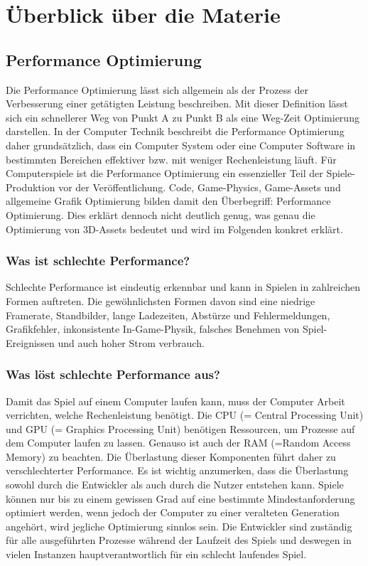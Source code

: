 \chapter{Überblick über die Materie}

\section{Performance Optimierung}

Die Performance Optimierung lässt sich allgemein als der Prozess der Verbesserung einer getätigten Leistung beschreiben. Mit dieser Definition lässt sich ein schnellerer Weg von Punkt A zu Punkt B als eine Weg-Zeit Optimierung darstellen. In der Computer Technik beschreibt die Performance Optimierung daher grundsätzlich, dass ein Computer System oder eine Computer Software in bestimmten Bereichen effektiver bzw. mit weniger Rechenleistung läuft. Für Computerspiele ist die Performance Optimierung ein essenzieller Teil der Spiele-Produktion vor der Veröffentlichung. Code, Game-Physics, Game-Assets und allgemeine Grafik Optimierung bilden damit den Überbegriff: Performance Optimierung. Dies erklärt dennoch nicht deutlich genug, was genau die Optimierung von 3D-Assets bedeutet und wird im Folgenden konkret erklärt.\cite[648]{_advances}

\subsection{Was ist schlechte Performance?}

Schlechte Performance ist eindeutig erkennbar und kann in Spielen in zahlreichen Formen auftreten. Die gewöhnlichsten Formen davon sind eine niedrige Framerate, Standbilder, lange Ladezeiten, Abstürze und Fehlermeldungen, Grafikfehler, inkonsistente In-Game-Physik, falsches Benehmen von Spiel-Ereignissen und auch hoher Strom verbrauch.

\subsection{Was löst schlechte Performance aus?}

Damit das Spiel auf einem Computer laufen kann, muss der Computer Arbeit verrichten, welche Rechenleistung benötigt. Die CPU (= Central Processing Unit) und GPU (= Graphics Processing Unit) benötigen Ressourcen, um Prozesse auf dem Computer laufen zu lassen. Genauso ist auch der RAM (=Random Access Memory) zu beachten. Die Überlastung dieser Komponenten führt daher zu verschlechterter Performance. Es ist wichtig anzumerken, dass die Überlastung sowohl durch die Entwickler als auch durch die Nutzer entstehen kann.\cite[17]{_unity_game_optimization} Spiele können nur bis zu einem gewissen Grad auf eine bestimmte Mindestanforderung optimiert werden, wenn jedoch der Computer zu einer veralteten Generation angehört, wird jegliche Optimierung sinnlos sein. Die Entwickler sind zuständig für alle ausgeführten Prozesse während der Laufzeit des Spiels und deswegen in vielen Instanzen hauptverantwortlich für ein schlecht laufendes Spiel.

